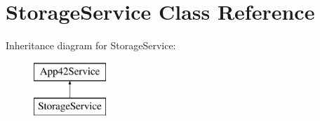 \hypertarget{class_storage_service}{\section{Storage\+Service Class Reference}
\label{class_storage_service}
}
Inheritance diagram for Storage\+Service\+:\begin{figure}[H]
\begin{center}
\leavevmode
\includegraphics[height=2.000000cm]{class_storage_service}
\end{center}
\end{figure}

